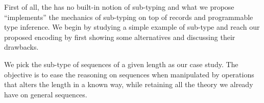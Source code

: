 %
%
%
%

First of all, the \mcbCIC{} has no built-in notion of sub-typing and
what we propose ``implements'' the mechanics of sub-typing on top
of records and programmable type inference.  We begin by studying a
simple example of sub-type and reach our proposed encoding by first
showing some alternatives and discussing their drawbacks.

We pick the sub-type of sequences of a given length as our case study.
The objective is to ease the reasoning on sequences when manipulated
by operations that alters the length in a known way, while retaining
all the theory we already have on general sequences.

